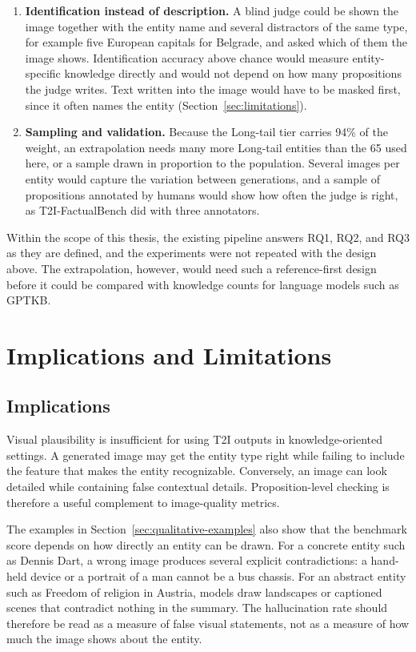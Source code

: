 \begin{enumerate}
\item \textbf{Identification instead of description.} A blind judge could be
shown the image together with the entity name and several distractors of the
same type, for example five European capitals for Belgrade, and asked which of
them the image shows. Identification accuracy above chance would measure
entity-specific knowledge directly and would not depend on how many
propositions the judge writes. Text written into the image would have to be
masked first, since it often names the entity (Section~\ref{sec:limitations}).

\item \textbf{Sampling and validation.} Because the Long-tail tier carries 94\%
of the weight, an extrapolation needs many more Long-tail entities than the 65
used here, or a sample drawn in proportion to the population. Several images
per entity would capture the variation between generations, and a sample of
propositions annotated by humans would show how often the judge is right, as
T2I-FactualBench did with three annotators.
\end{enumerate}

Within the scope of this thesis, the existing pipeline answers RQ1, RQ2, and
RQ3 as they are defined, and the experiments were not repeated with the design
above. The extrapolation, however, would need such a reference-first design
before it could be compared with knowledge counts for language models such as
GPTKB.

\section{Implications and Limitations}
\label{sec:implications}

\subsection{Implications}

Visual plausibility is insufficient for using T2I outputs in knowledge-oriented
settings. A generated image may get the entity type right while failing to
include the feature that makes the entity recognizable. Conversely, an image can
look detailed while containing false contextual details. Proposition-level
checking is therefore a useful complement to image-quality metrics.

The examples in Section~\ref{sec:qualitative-examples} also show that the
benchmark score depends on how directly an entity can be drawn. For a concrete
entity such as Dennis Dart, a wrong image produces several explicit
contradictions: a hand-held device or a portrait of a man cannot be a bus
chassis. For an abstract entity such as Freedom of religion in Austria, models
draw landscapes or captioned scenes that contradict nothing in the summary.
The hallucination rate should therefore be read as a measure of false visual
statements, not as a measure of how much the image shows about the entity.

